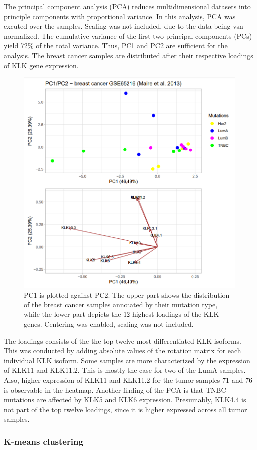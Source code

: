 \documentclass[
]{article}
\begin{document}
The principal component analysis (PCA) reduces multidimensional datasets
into principle components with proportional variance. In this analysis,
PCA was excuted over the samples. Scaling was not included, due to the
data being vsn-normalized. The cumulative variance of the first two
principal components (PCs) yield 72\% of the total variance. Thus, PC1
and PC2 are sufficient for the analysis. The breast cancer samples are
distributed after their respective loadings of KLK gene expression.\\

\begin{figure}

{\centering \includegraphics[width=0.5\linewidth]{images/PCAplot_breast} 

}

\caption{PC1 is plotted against PC2. The upper part shows the distribution of the breast cancer samples annotated by their mutation type, while the lower part depicts the 12 highest loadings of the KLK genes. Centering was enabled, scaling was not included.}\label{fig:PCA plot - breast }
\end{figure}

The loadings consists of the the top twelve most differentiated KLK
isoforms. This was conducted by adding absolute values of the rotation
matrix for each individual KLK isoform. Some samples are more
characterized by the expression of KLK11 and KLK11.2. This is mostly the
case for two of the LumA samples. Also, higher expression of KLK11 and
KLK11.2 for the tumor samples 71 and 76 is observable in the heatmap.
Another finding of the PCA is that TNBC mutations are affected by KLK5
and KLK6 expression. Presumably, KLK4.4 is not part of the top twelve
loadings, since it is higher expressed across all tumor samples.

\hypertarget{k-means-clustering}{%
\subsubsection{K-means clustering}\label{k-means-clustering}}
\end{document}
